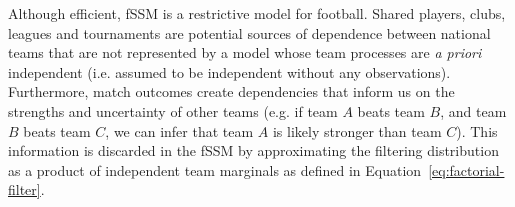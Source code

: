 Although efficient, fSSM is a restrictive model for football. Shared players, clubs, leagues and tournaments are potential sources of dependence between national teams that are not represented by a model whose team processes are \textit{a priori} independent (i.e. assumed to be independent without any observations). Furthermore, match outcomes create dependencies that inform us on the strengths and uncertainty of other teams (e.g. if team $A$ beats team $B$, and team $B$ beats team $C$, we can infer that team $A$ is likely stronger than team $C$). This information is discarded in the fSSM by approximating the filtering distribution as a product of independent team marginals as defined in Equation~\eqref{eq:factorial-filter}. 



